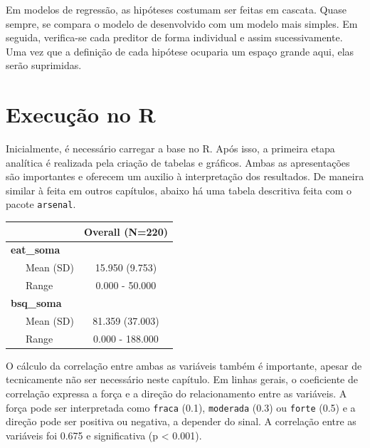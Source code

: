 \documentclass[
]{book}
\newenvironment{Shaded}{\begin{snugshade}}{\end{snugshade}}
\newcommand{\KeywordTok}[1]{\textcolor[rgb]{0.13,0.29,0.53}{\textbf{#1}}}
\newcommand{\NormalTok}[1]{#1}
\newcommand{\OperatorTok}[1]{\textcolor[rgb]{0.81,0.36,0.00}{\textbf{#1}}}
\newcommand{\StringTok}[1]{\textcolor[rgb]{0.31,0.60,0.02}{#1}}
\begin{document}
Em modelos de regressão, as hipóteses costumam ser feitas em cascata. Quase sempre, se compara o modelo de desenvolvido com um modelo mais simples. Em seguida, verifica-se cada preditor de forma individual e assim sucessivamente. Uma vez que a definição de cada hipótese ocuparia um espaço grande aqui, elas serão suprimidas.

\hypertarget{execuuxe7uxe3o-no-r-13}{%
\section{Execução no R}\label{execuuxe7uxe3o-no-r-13}}

Inicialmente, é necessário carregar a base no R. Após isso, a primeira etapa analítica é realizada pela criação de tabelas e gráficos. Ambas as apresentações são importantes e oferecem um auxilio à interpretação dos resultados. De maneira similar à feita em outros capítulos, abaixo há uma tabela descritiva feita com o pacote \texttt{arsenal}.

\begin{Shaded}
\end{Shaded}

\begin{longtable}[]{@{}lc@{}}
\toprule
& Overall (N=220)\tabularnewline
\midrule
\endhead
\textbf{eat\_soma} &\tabularnewline
~~~Mean (SD) & 15.950 (9.753)\tabularnewline
~~~Range & 0.000 - 50.000\tabularnewline
\textbf{bsq\_soma} &\tabularnewline
~~~Mean (SD) & 81.359 (37.003)\tabularnewline
~~~Range & 0.000 - 188.000\tabularnewline
\bottomrule
\end{longtable}

O cálculo da correlação entre ambas as variáveis também é importante, apesar de tecnicamente não ser necessário neste capítulo. Em linhas gerais, o coeficiente de correlação expressa a força e a direção do relacionamento entre as variáveis. A força pode ser interpretada como \texttt{fraca} (0.1), \texttt{moderada} (0.3) ou \texttt{forte} (0.5) \citep{Cohen1988} e a direção pode ser positiva ou negativa, a depender do sinal. A correlação entre as variáveis foi 0.675 e significativa (p \textless{} 0.001).

\begin{Shaded}
\end{Shaded}
\end{document}
